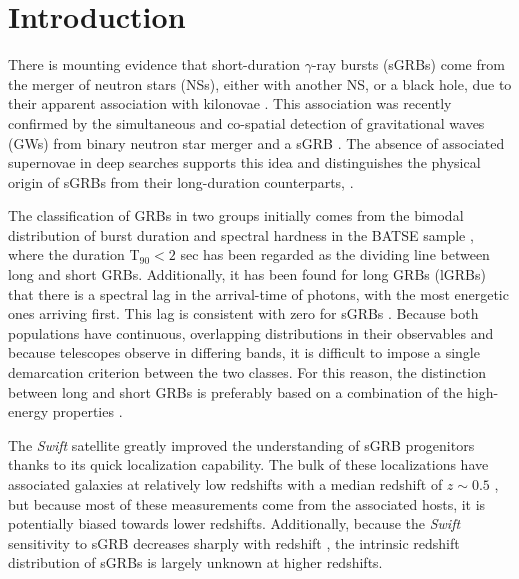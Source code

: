 \documentclass{aa}    %
\begin{document}

\maketitle

\section{Introduction}

There is mounting evidence that short-duration $\gamma$-ray bursts (sGRBs) come
from the merger of neutron stars (NSs), either with another NS, or a black hole,
due to their apparent association with kilonovae \citep{Barnes2013a,
	Tanvir2013b, Berger2013b, Yang2015, Jin2016, Rosswog2016}. This association was
recently confirmed by the simultaneous and co-spatial detection of gravitational
waves (GWs) from binary neutron star merger and a sGRB
\citep{LIGOScientificCollaboration2017a, Goldstein2017, Savchenko2017}. The
absence of associated supernovae in deep searches
\citep[e.g.][]{Hjorth2005a,Fox2005,Hjorth2005b, Kann2011} supports this idea and
distinguishes the physical origin of sGRBs from their long-duration
counterparts, \citep[albeit see also][]{Fynbo2006b, Valle2006, Gal-Yam2006}.

The classification of GRBs in two groups initially comes from the bimodal
distribution of burst duration and spectral hardness in the BATSE sample \citep{Kouveliotou1993},
where the duration T$_{90} < 2$ sec has been regarded as the dividing line between long
and short GRBs. Additionally, it has been found for long GRBs (lGRBs) that there is a
spectral lag in the arrival-time of photons, with the most energetic ones
arriving first. This lag is consistent with zero for sGRBs
\citep{Norris2006}. Because both populations have continuous, overlapping
distributions in their observables and because telescopes observe in differing
bands, it is difficult to impose a single demarcation criterion between the two
classes. For this reason, the distinction between long and short GRBs is
preferably based on a combination of the high-energy properties \citep{Zhang2009,
	Kann2011, Bromberg2012a, Bromberg2013}.

The \textit{Swift} satellite \citep{Gehrels2004} greatly improved the
understanding of sGRB progenitors thanks to its quick localization capability.
The bulk of these localizations have associated galaxies at relatively low
redshifts with a median redshift of $z\sim0.5$ \citep{Berger2014}, but because
most of these measurements come from the associated hosts, it is potentially
biased towards lower redshifts. Additionally, because the \textit{Swift}
sensitivity to sGRB decreases sharply with redshift \citep{Behroozi2014}, the
intrinsic redshift distribution of sGRBs is largely unknown at higher redshifts.
\end{document}
